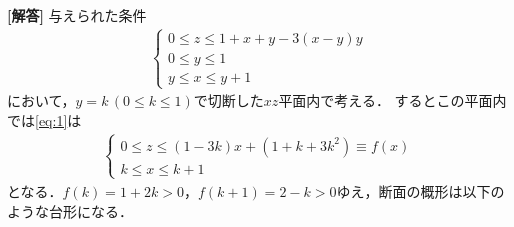\documentclass[../../main.tex]{subfiles}
\begin{document}
\begin{oframed}
  
\end{oframed}

{\bf [解答]}
与えられた条件
\begin{align}
  \begin{cases}
    0 \le z \le 1+x+y-3(x-y)y \\
    0 \le y \le 1 \\
    y \le x \le y+1
  \end{cases} \label{eq:1}
\end{align}
において，$y=k\,(0\le k \le 1)$で切断した$xz$平面内で考える．
するとこの平面内では\cref{eq:1}は
\begin{align}
  \begin{cases}
    0\le z\le (1-3k)x+(1+k+3k^2)\equiv f(x) \\
    k\le x\le k+1
  \end{cases}
\end{align}
となる．$f(k)=1+2k>0$，$f(k+1)=2-k>0$ゆえ，断面の概形は以下のような台形になる．
\end{document}
